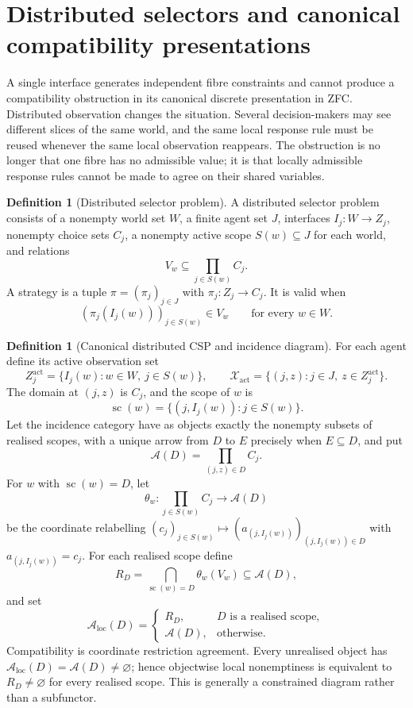 \documentclass[11pt]{article}
\theoremstyle{plain}
\theoremstyle{definition}
\newtheorem{definition}[theorem]{Definition}
\theoremstyle{remark}
\newcommand{\LocalAdm}{\mathcal{A}_{\mathrm{loc}}}
\begin{document}
\section{Distributed selectors and canonical compatibility presentations}\label{sec:distributed}

A single interface generates independent fibre constraints and cannot produce a
compatibility obstruction in its canonical discrete presentation in ZFC.
Distributed observation changes the situation. Several decision-makers may see
different slices of the same world, and the same local response rule must be
reused whenever the same local observation reappears. The obstruction is no
longer that one fibre has no admissible value; it is that locally admissible
response rules cannot be made to agree on their shared variables.

\begin{definition}[Distributed selector problem]\label{def:distributed}
A distributed selector problem consists of a nonempty world set $W$, a finite
agent set $J$, interfaces $I_j:W\to Z_j$, nonempty choice sets $C_j$, a nonempty
active scope $S(w)\subseteq J$ for each world, and relations
\[
V_w\subseteq\prod_{j\in S(w)}C_j.
\]
A strategy is a tuple $\pi=(\pi_j)_{j\in J}$ with
$\pi_j:Z_j\to C_j$. It is valid when
\[
(\pi_j(I_j(w)))_{j\in S(w)}\in V_w
\qquad\text{for every }w\in W.
\]
\end{definition}

\begin{definition}[Canonical distributed CSP and incidence diagram]
\label{def:distributed-csp}
For each agent define its active observation set
\[
Z_j^{\mathrm{act}}=\{I_j(w):w\in W,\ j\in S(w)\},
\qquad
\mathcal X_{\mathrm{act}}
=\{(j,z):j\in J,\ z\in Z_j^{\mathrm{act}}\}.
\]
The domain at $(j,z)$ is $C_j$, and the scope of $w$ is
\[
\operatorname{sc}(w)=\{(j,I_j(w)):j\in S(w)\}.
\]
Let the incidence category have as objects exactly the nonempty subsets of
realised scopes, with a unique arrow from $D$ to $E$ precisely when
$E\subseteq D$, and put
\[
\mathcal A(D)=\prod_{(j,z)\in D}C_j.
\]
For $w$ with $\operatorname{sc}(w)=D$, let
\[
\theta_w:\prod_{j\in S(w)}C_j\to\mathcal A(D)
\]
be the coordinate relabelling
$(c_j)_{j\in S(w)}\mapsto(a_{(j,I_j(w))})_{(j,I_j(w))\in D}$ with
$a_{(j,I_j(w))}=c_j$. For each realised scope define
\[
R_D=\bigcap_{\operatorname{sc}(w)=D}\theta_w(V_w)
\subseteq\mathcal A(D),
\]
and set
\[
\LocalAdm(D)=
\begin{cases}
R_D,&D\text{ is a realised scope},\\
\mathcal A(D),&\text{otherwise}.
\end{cases}
\]
Compatibility is coordinate restriction agreement. Every unrealised object has
$\LocalAdm(D)=\mathcal A(D)\ne\varnothing$; hence objectwise local nonemptiness
is equivalent to $R_D\ne\varnothing$ for every realised scope. This is generally
a constrained diagram rather than a subfunctor.
\end{definition}
\end{document}
